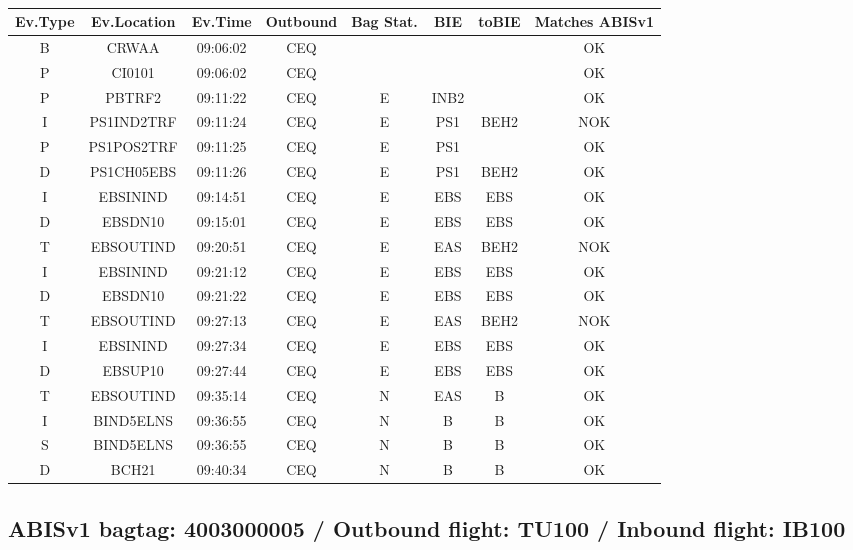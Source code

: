 \documentclass{report}
\begin{document}
\paragraph{}
\begin{longtable}{cccccccc}    \toprule
\rowcolor{white!50}
\textbf{Ev.Type} & \textbf{Ev.Location} & \textbf{Ev.Time} & \textbf{Outbound} & \textbf{Bag Stat.} & \textbf{BIE} & \textbf{toBIE} & \textbf{Matches ABISv1} \\\midrule
B & CRWAA & 09:06:02  & CEQ &  &  &  & OK\\
P & CI0101 & 09:06:02  & CEQ &  &  &  & OK\\
P & PBTRF2 & 09:11:22  & CEQ & E & INB2 &  & OK\\
I & PS1IND2TRF & 09:11:24  & CEQ & E & PS1 & BEH2 & NOK\\
P & PS1POS2TRF & 09:11:25  & CEQ & E & PS1 &  & OK\\
D & PS1CH05EBS & 09:11:26  & CEQ & E & PS1 & BEH2 & OK\\
I & EBSININD & 09:14:51  & CEQ & E & EBS & EBS & OK\\
D & EBSDN10 & 09:15:01  & CEQ & E & EBS & EBS & OK\\
T & EBSOUTIND & 09:20:51  & CEQ & E & EAS & BEH2 & NOK\\
I & EBSININD & 09:21:12  & CEQ & E & EBS & EBS & OK\\
D & EBSDN10 & 09:21:22  & CEQ & E & EBS & EBS & OK\\
T & EBSOUTIND & 09:27:13  & CEQ & E & EAS & BEH2 & NOK\\
I & EBSININD & 09:27:34  & CEQ & E & EBS & EBS & OK\\
D & EBSUP10 & 09:27:44  & CEQ & E & EBS & EBS & OK\\
T & EBSOUTIND & 09:35:14  & CEQ & N & EAS & B & OK\\
I & BIND5ELNS & 09:36:55  & CEQ & N & B & B & OK\\
S & BIND5ELNS & 09:36:55  & CEQ & N & B & B & OK\\
D & BCH21 & 09:40:34  & CEQ & N & B & B & OK\\
\bottomrule
\end{longtable}
\subsection*{ABISv1 bagtag: 4003000005 / Outbound flight: TU100 / Inbound flight: IB100}
\end{document}
